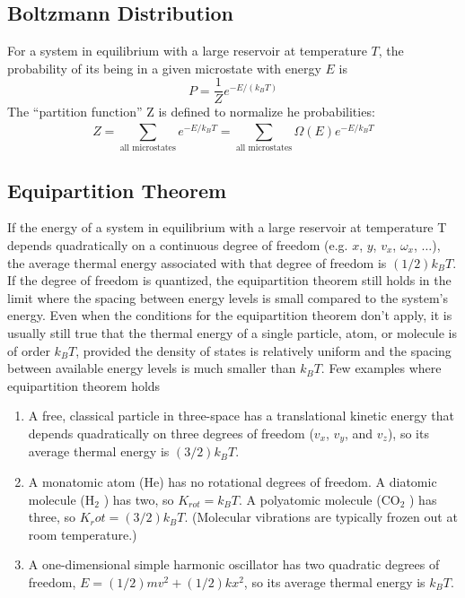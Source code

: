 \documentclass[../../main.tex]{subfiles}
\begin{document}
\subsection{Boltzmann Distribution}
For a system in equilibrium with a large reservoir at temperature $T$, the probability of its being in a given microstate with energy $E$ is
\begin{equation*}
    P=\frac{1}{Z}e^{-E/(k_BT)}
\end{equation*}
The “partition function” Z is defined to normalize  he probabilities:
\begin{equation*}
    Z=\sum_{\text{all microstates}}^{} e^{-E/k_BT} = \sum_{\text{all microstates}}^{}\Omega(E) e^{-E/k_BT}
\end{equation*}

\subsection{Equipartition Theorem}
If the energy of a system in equilibrium with a large reservoir at temperature T depends quadratically on a continuous degree of freedom (e.g. $x$, $y$, $v_x$, $\omega_x$, $\dots$), the average thermal energy associated with that degree of freedom is $(1/2)k_B T$. If the degree of freedom is quantized, the equipartition theorem still holds in the limit where the spacing between energy levels is small compared to the system's energy. Even when the conditions for the equipartition theorem don't apply, it is usually still true that the thermal energy of a single particle, atom, or molecule is of order $ k_B T$, provided the density of states is relatively
uniform and the spacing between available energy levels is much smaller than $k_B T$. Few examples where equipartition theorem holds
\begin{enumerate}
    \item A free, classical particle in three-space has a translational kinetic energy that depends quadratically on three degrees of freedom ($v_x$, $v_y$, and $v_z$), so its average thermal energy is $(3/2)k_B T$.
    \item A monatomic atom (He) has no rotational degrees of freedom. A diatomic molecule ($\text{H}_2$ ) has two, so $K_{rot} = k_BT$. A polyatomic molecule ($\text{CO}_2$ ) has three, so $K_rot = (3/2)k_B T$. (Molecular vibrations are typically frozen out at room temperature.)
    \item A one-dimensional simple harmonic oscillator has two quadratic degrees of freedom, $E = (1/2)mv^2 + (1/2)kx^2$,  so its average thermal energy is $k_B T$.
\end{enumerate}
\end{document}
